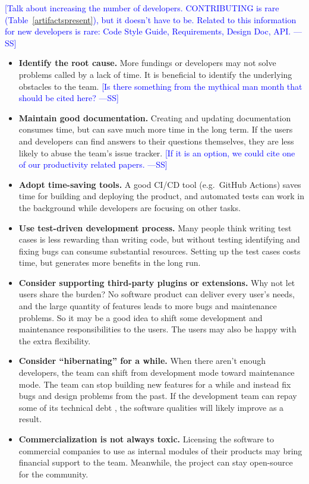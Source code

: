 \documentclass[final, 3p, times, authoryear]{elsarticle}
\newcommand{\authornote}[3]{\textcolor{#1}{[#3 ---#2]}}
\newcommand{\authornote}[3]{}
\newcommand{\wss}[1]{\authornote{blue}{SS}{#1}} %
\begin{document}
\wss{Talk about increasing the number of developers.  CONTRIBUTING is rare
(Table~\ref{artifactspresent}), but it doesn't have to be.  Related to this
information for new developers is rare: Code Style Guide, Requirements, Design
Doc, API.}

\begin{itemize}
\item \textbf{Identify the root cause.} More fundings or developers may not
solve problems called by a lack of time. It is beneficial to identify the
underlying obstacles to the team.  \wss{Is there something from the mythical man
month that should be cited here?}

\item \textbf{Maintain good documentation.} Creating and updating documentation
consumes time, but can save much more time in the long term. If the users and
developers can find answers to their questions themselves, they are less likely
to abuse the team's issue tracker.  \wss{If it is an option, we could cite one
of our productivity related papers.}

\item \textbf{Adopt time-saving tools.} A good CI/CD tool (e.g.\ GitHub Actions)
saves time for building and deploying the product, and automated tests can work
in the background while developers are focusing on other tasks.

\item \textbf{Use test-driven development process.} Many people think writing
test cases is less rewarding than writing code, but without testing identifying
and fixing bugs can consume substantial resources. Setting up the test cases
costs time, but generates more benefits in the long run.

\item \textbf{Consider supporting third-party plugins or extensions.} Why not
let users share the burden? No software product can deliver every user's needs,
and the large quantity of features leads to more bugs and maintenance problems.
So it may be a good idea to shift some development and maintenance
responsibilities to the users. The users may also be happy with the extra
flexibility.

\item \textbf{Consider ``hibernating'' for a while.} When there aren't enough
developers, the team can shift from development mode toward maintenance mode.
The team can stop building new features for a while and instead fix bugs and
design problems from the past. If the development team can repay some of its
technical debt \citep{KruchtenEtAl2012}, the software qualities will likely
improve as a result.

\item \textbf{Commercialization is not always toxic.} Licensing the software to
commercial companies to use as internal modules of their products may bring
financial support to the team. Meanwhile, the project can stay open-source for
the community.
\end{itemize}
\end{document}
